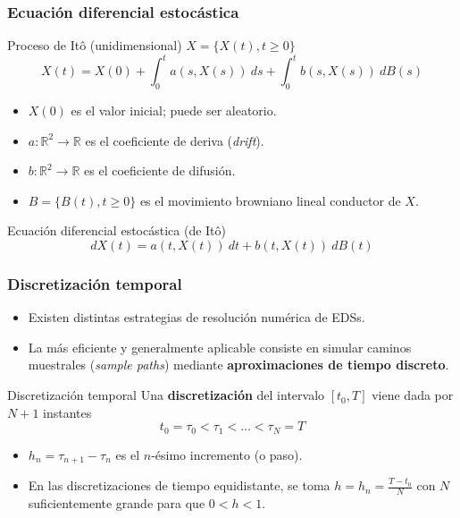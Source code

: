 \documentclass[10pt]{beamer}
\newcommand{\Real}{\mathbb{R}}
\newcommand{\Dif}[1]{d #1}
\newcommand{\Intt}[4]{\int_{#1}^{#2}{#3~\Dif{#4}}}
\begin{document}
\frame
{
    \frametitle{Ecuación diferencial estocástica}

    \begin{block}{Proceso de Itô (unidimensional) $X = \{X(t), t \geq 0\}$}
    \begin{displaymath}
        X(t) = X(0) + \Intt{0}{t}{a(s,X(s))}{s} + \Intt{0}{t}{b(s,X(s))}{B(s)}
    \end{displaymath}
    \end{block}
    \vspace{-0.1cm}
    \begin{itemize}
        \item<2-> $X(0)$ es el valor inicial; puede ser aleatorio.
        \item<3-> $a : \Real^2 \to \Real$ es el coeficiente de deriva (\textsl{drift}).
        \item<4-> $b : \Real^2 \to \Real$ es el coeficiente de difusión.
        \item<5-> $B = \{B(t), t \geq 0\}$ es el movimiento browniano lineal conductor de $X$.
    \end{itemize}

    {
    \begin{block}{Ecuación diferencial estocástica (de Itô)}
    \begin{displaymath}
        \Dif{X(t)} = a(t,X(t)) ~\Dif{t} + b(t,X(t)) ~\Dif{B(t)}
    \end{displaymath}
    \end{block}
    }
}

\frame
{
    \frametitle{Discretización temporal}

    \begin{itemize}
        \item Existen distintas estrategias de resolución numérica de EDSs.
        \item La más eficiente y generalmente aplicable consiste en simular
        caminos muestrales (\textsl{sample paths}) mediante \textbf{aproximaciones 
        de tiempo discreto}.
    \end{itemize}

    {
        \begin{block}{Discretización temporal}
        Una \textbf{discretización} del intervalo $[t_0, T]$ viene dada por 
        $N+1$ instantes
        $$t_0 = \tau_0 < \tau_1 < \dots < \tau_N = T$$
        \end{block}
    }

        \begin{itemize}
            \item<3-> $h_n = \tau_{n+1} - \tau_n$ es el $n$-ésimo incremento (o paso).
            \item<4-> En las discretizaciones de tiempo equidistante, se toma $h = h_n = \frac{T - t_0}{N}$
            con $N$ suficientemente grande para que $0 < h < 1$.
        \end{itemize}
}
\end{document}

